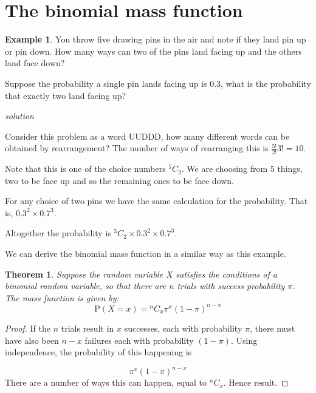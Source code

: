\documentclass[
]{book}
\newtheorem{theorem}{Theorem}[chapter]
\theoremstyle{definition}
\theoremstyle{definition}
\newtheorem{example}{Example}[chapter]
\theoremstyle{definition}
\theoremstyle{definition}
\theoremstyle{remark}
\begin{document}
\hypertarget{the-binomial-mass-function}{%
\section{The binomial mass function}\label{the-binomial-mass-function}}

\begin{example}
You throw five drawing pins in the air and note if they land pin up or pin down. How many ways can two of the pins land facing up and the others land face down?

Suppose the probability a single pin lands facing up is \(0.3\), what is the probability that exactly two land facing up?

\emph{solution}

Consider this problem as a word UUDDD, how many different words can be obtained by rearrangement? The number of ways of rearranging this is \(\frac{5!}{2!}{3!} = 10\).

Note that this is one of the choice numbers \(^5C_2\). We are choosing from \(5\) things, two to be face up and so the remaining ones to be face down.

For any choice of two pins we have the same calculation for the probability. That is, \(0.3^2 \times 0.7^3\).

Altogether the probability is \(^5C_2 \times 0.3^2 \times 0.7^3\).
\end{example}

We can derive the binomial mass function in a similar way as this example.

\begin{theorem}
Suppose the random variable \(X\) satisfies the conditions of a binomial random variable, so that there are \(n\) trials with success probability \(\pi\). The mass function is given by:
\[\text{P}(X=x) = {}^nC_x \pi^{x}(1-\pi)^{n-x}\]
\end{theorem}

\begin{proof}
If the \(n\) trials result in \(x\) successes, each with probability \(\pi\), there must have also been \(n-x\) failures each with probability \((1-\pi)\). Using independence, the probability of this happening is

\[\pi ^x (1-\pi)^{n-x} \]
There are a number of ways this can happen, equal to \(^nC_x\). Hence result.
\end{proof}
\end{document}
